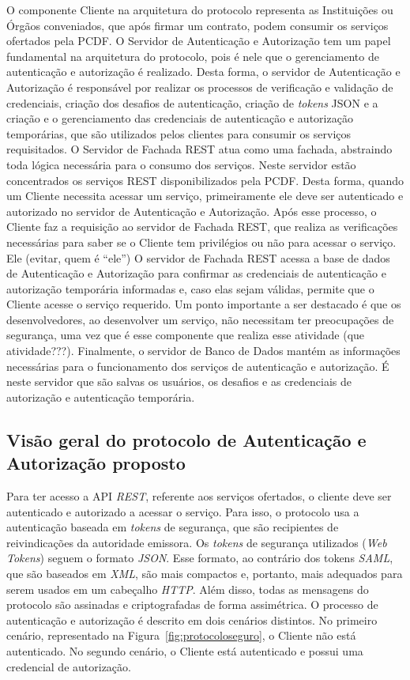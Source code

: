 O componente Cliente na arquitetura do protocolo representa as Instituições ou Órgãos conveniados, que após firmar um contrato, podem consumir os serviços ofertados pela PCDF.
O Servidor de Autenticação e Autorização tem um papel fundamental na arquitetura do protocolo, pois é nele que o gerenciamento de autenticação e autorização é realizado. Desta forma, o servidor de Autenticação e Autorização é responsável por realizar os processos de verificação e validação de credenciais, criação dos desafios de autenticação, criação de \emph{tokens} JSON e a criação e o gerenciamento das credenciais de autenticação e autorização temporárias, que são utilizados pelos clientes para consumir os serviços requisitados.
O Servidor de Fachada REST atua como uma fachada, abstraindo toda lógica necessária para o consumo dos serviços. Neste servidor estão concentrados os serviços REST disponibilizados pela PCDF. Desta forma, quando um Cliente necessita acessar um serviço, primeiramente ele deve ser autenticado e autorizado no servidor de Autenticação e Autorização. Após esse processo, o Cliente faz a requisição ao servidor de Fachada REST, que realiza as verificações necessárias para saber se o Cliente tem privilégios ou não para acessar o serviço. {\color{red}Ele (evitar, quem \'{e} ``ele'')} O servidor de Fachada REST acessa a base de dados de Autenticação e Autorização para confirmar as credenciais de autenticação e autorização temporária informadas e, caso elas sejam válidas, permite que o Cliente acesse o serviço requerido. Um ponto importante a ser destacado é que os desenvolvedores, ao desenvolver um serviço, não necessitam ter preocupações de segurança, uma vez que é esse componente que realiza {\color{red}esse atividade (que atividade???)}. Finalmente, o servidor de Banco de Dados mant\'{e}m as informa\c c\~{o}es necess\'{a}rias   para o funcionamento dos serviços de autenticação e autorização. É neste servidor que são salvas os usuários, os desafios e as credenciais de autorização e autenticação temporária.


\subsection{Visão geral do protocolo de Autenticação e Autorização proposto}

Para ter acesso a API \emph{REST}, referente aos serviços ofertados, o cliente deve ser autenticado e autorizado a acessar o serviço. Para isso, o protocolo usa a autenticação baseada em \emph{tokens} de segurança, que são recipientes de reivindicações da autoridade emissora. Os \emph{tokens} de segurança utilizados (\emph{Web Tokens}) seguem o formato \emph{JSON}. Esse formato, ao contrário dos tokens \emph{SAML}, que são baseados em \emph{XML}, são mais compactos e, portanto, mais adequados para serem usados em um cabeçalho \emph{HTTP}. Além disso, todas as mensagens do protocolo s\~{a}o assinadas e criptografadas de forma assimétrica. O processo de autenticação e autorização é descrito em dois cenários distintos. No primeiro cenário, representado na Figura~\ref{fig:protocoloseguro}, o Cliente não está autenticado. No segundo cenário, o Cliente está autenticado e possui uma 
credencial de autorização. %


